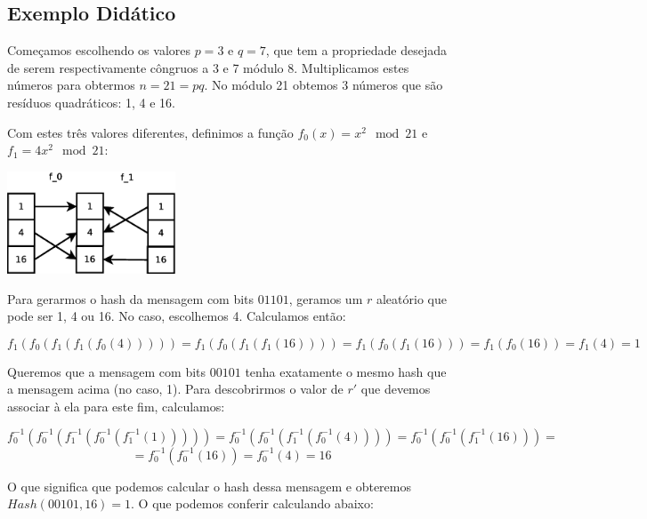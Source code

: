 \documentclass[a4paper]{article}
\begin{document}
 
 
 
 
 
 \subsection{Exemplo Didático}
 
 Começamos escolhendo os valores $p=3$ e $q=7$, que tem a propriedade
 desejada de serem respectivamente côngruos a 3 e 7 módulo
 8. Multiplicamos estes números para obtermos $n = 21 = pq$. No módulo
 21 obtemos 3 números que são resíduos quadráticos: 1, 4 e 16.
 
 Com estes três valores diferentes, definimos a função $f_0(x)=x^2\mod
 21$ e $f_1=4x^2\mod 21$:
 
 \includegraphics[width=5cm]{imagens/toy1.eps}
 
 Para gerarmos o hash da mensagem com bits $01101$, geramos um $r$
 aleatório que pode ser 1, 4 ou 16. No caso, escolhemos 4. Calculamos
 então:
 
 $$
 f_1(f_0(f_1(f_1(f_0(4))))) = f_1(f_0(f_1(f_1(16)))) = f_1(f_0(f_1(16))) =
 f_1(f_0(16)) = f_1(4) = 1
 $$
 
 Queremos que a mensagem com bits $00101$ tenha exatamente o mesmo hash
 que a mensagem acima (no caso, 1). Para descobrirmos o valor de $r'$
 que devemos associar à ela para este fim, calculamos:
 
 $$
 f_0^{-1}(f_0^{-1}(f_1^{-1}(f_0^{-1}(f_1^{-1}(1))))) =
 f_0^{-1}(f_0^{-1}(f_1^{-1}(f_0^{-1}(4)))) =
 f_0^{-1}(f_0^{-1}(f_1^{-1}(16))) =
 $$
 $$
 =f_0^{-1}(f_0^{-1}(16)) = f_0^{-1}(4) = 16
 $$
 
 O que significa que podemos calcular o hash dessa mensagem e obteremos
 $Hash(00101, 16)=1$. O que podemos conferir calculando abaixo:
 
\end{document}
